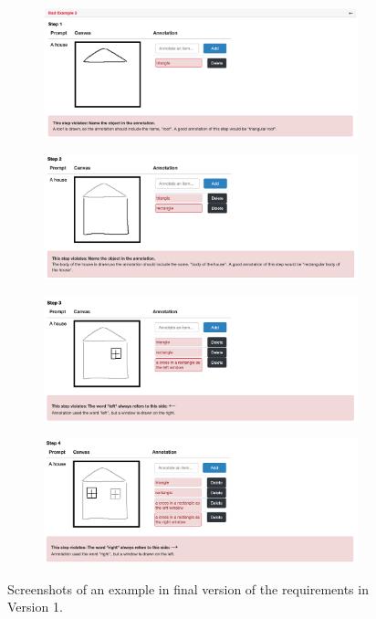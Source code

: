 \begin{figure}[!htb]
\begin{subfigure}{\textwidth}
\centering
\includegraphics[width=.8\linewidth]{data_collection/v1_badeg_1.png}  
\end{subfigure}
\newline
\begin{subfigure}{\textwidth}
\centering
\includegraphics[width=.8\linewidth]{data_collection/v1_badeg_2.png}  
\end{subfigure}
\newline
\begin{subfigure}{\textwidth}
\centering
\includegraphics[width=.8\linewidth]{data_collection/v1_badeg_3.png}  
\end{subfigure}
\newline
\begin{subfigure}{\textwidth}
\centering
\includegraphics[width=.8\linewidth]{data_collection/v1_badeg_4.png}  
\end{subfigure}
\caption{Screenshots of an example in final version of the requirements in Version 1.}
\label{v1.badeg}
\end{figure}

